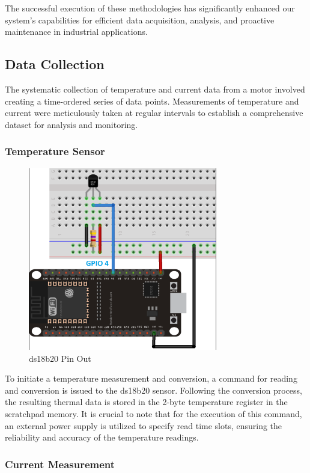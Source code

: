 The successful execution of these methodologies has significantly enhanced our system's capabilities for efficient data acquisition, analysis, and proactive maintenance in industrial applications.


\subsection{Data Collection}

The systematic collection of temperature and current data from a motor involved creating a time-ordered series of data points. Measurements of temperature and current were meticulously taken at regular intervals to establish a comprehensive dataset for analysis and monitoring.

\subsubsection{Temperature Sensor}

\begin{figure}[!h]
	\centering
	\includegraphics[width=0.7\linewidth, height=8cm]{Figures/ds18b20}
	\caption{ds18b20 Pin Out}
\end{figure}

To initiate a temperature measurement and conversion, a command for reading and conversion is issued to the ds18b20 sensor. Following the conversion process, the resulting thermal data is stored in the 2-byte temperature register in the scratchpad memory. It is crucial to note that for the execution of this command, an external power supply is utilized to specify read time slots, ensuring the reliability and accuracy of the temperature readings.

\subsubsection{Current Measurement}

